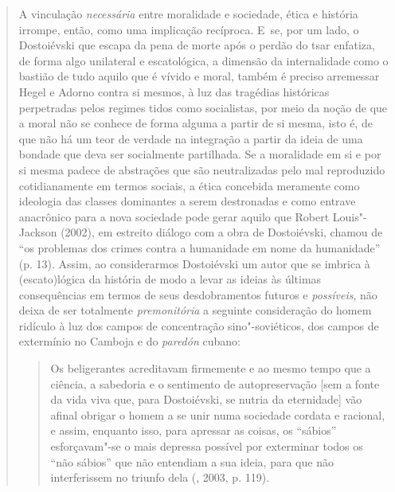 {\begin{quote}
A vinculação \emph{necessária} entre moralidade e sociedade, ética e
história irrompe, então, como uma implicação recíproca. E~se, por um
lado, o Dostoiévski que escapa da pena de morte após o perdão do tsar
enfatiza, de forma algo unilateral e escatológica, a dimensão da
internalidade como o bastião de tudo aquilo que é vívido e moral, também
é preciso arremessar Hegel e Adorno contra si mesmos, à luz das
tragédias históricas perpetradas pelos regimes tidos como socialistas,
por meio da noção de que a moral não se conhece de forma alguma a partir
de si mesma, isto é, de que não há um teor de verdade na integração a
partir da ideia de uma bondade que deva ser socialmente partilhada. Se a
moralidade em si e por si mesma padece de abstrações que são
neutralizadas pelo mal reproduzido cotidianamente em termos sociais, a
ética concebida meramente como ideologia das classes dominantes a serem
destronadas e como entrave anacrônico para a nova sociedade pode gerar
aquilo que Robert Louis"-Jackson (2002), em estreito diálogo com a obra
de Dostoiévski, chamou de ``os problemas dos crimes contra a humanidade
em nome da humanidade'' (p. 13). Assim, ao considerarmos Dostoiévski um
autor que se imbrica à (escato)lógica da história de modo a levar as
ideias às últimas consequências em termos de seus desdobramentos futuros
e \emph{possíveis}, não deixa de ser totalmente \emph{premonitória} a
seguinte consideração do homem ridículo à luz dos campos de concentração
sino"-soviéticos, dos campos de extermínio no Camboja e do \emph{paredón}
cubano:

\begin{quote}
Os beligerantes acreditavam firmemente e ao mesmo tempo que a ciência, a
sabedoria e o sentimento de autopreservação {[}sem a fonte da vida viva
que, para Dostoiévski, se nutria da eternidade{]} vão afinal obrigar o
homem a se unir numa sociedade cordata e racional, e assim, enquanto
isso, para apressar as coisas, os ``sábios'' esforçavam"-se o mais
depressa possível por exterminar todos os ``não sábios'' que não
entendiam a sua ideia, para que não interferissem no triunfo dela
(, 2003, p. 119).
\end{quote}


\end{quote}}
